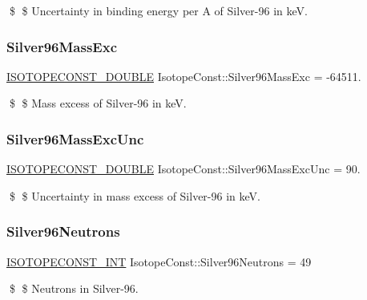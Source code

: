 \$ \$ Uncertainty in binding energy per A of Silver-\/96 in keV. \mbox{\label{group___isotope_const-_silver-_ag96_ga1ceb233a4ac61ed209308e0df2259efe}} 
\subsubsection{\texorpdfstring{Silver96\+Mass\+Exc}{Silver96MassExc}}
{\footnotesize\ttfamily \mbox{\hyperlink{group___isotope_const-_macros_ga8f45a7272ce02c0b4c65c44636ed719a}{I\+S\+O\+T\+O\+P\+E\+C\+O\+N\+S\+T\+\_\+\+D\+O\+U\+B\+LE}} Isotope\+Const\+::\+Silver96\+Mass\+Exc = -\/64511.}

\$ \$ Mass excess of Silver-\/96 in keV. \mbox{\label{group___isotope_const-_silver-_ag96_ga55a7698ae853e83b930ccb960bcceb9f}} 
\subsubsection{\texorpdfstring{Silver96\+Mass\+Exc\+Unc}{Silver96MassExcUnc}}
{\footnotesize\ttfamily \mbox{\hyperlink{group___isotope_const-_macros_ga8f45a7272ce02c0b4c65c44636ed719a}{I\+S\+O\+T\+O\+P\+E\+C\+O\+N\+S\+T\+\_\+\+D\+O\+U\+B\+LE}} Isotope\+Const\+::\+Silver96\+Mass\+Exc\+Unc = 90.}

\$ \$ Uncertainty in mass excess of Silver-\/96 in keV. \mbox{\label{group___isotope_const-_silver-_ag96_ga478b3dc8b1b3c42cfd5b13379fef869b}} 
\subsubsection{\texorpdfstring{Silver96\+Neutrons}{Silver96Neutrons}}
{\footnotesize\ttfamily \mbox{\hyperlink{group___isotope_const-_macros_ga5f18360b3e99483a35c32d789e62621c}{I\+S\+O\+T\+O\+P\+E\+C\+O\+N\+S\+T\+\_\+\+I\+NT}} Isotope\+Const\+::\+Silver96\+Neutrons = 49}

\$ \$ Neutrons in Silver-\/96. \mbox{\label{group___isotope_const-_silver-_ag96_ga983a8b2c34e750eaeae6b1db4a90dcae}} 
